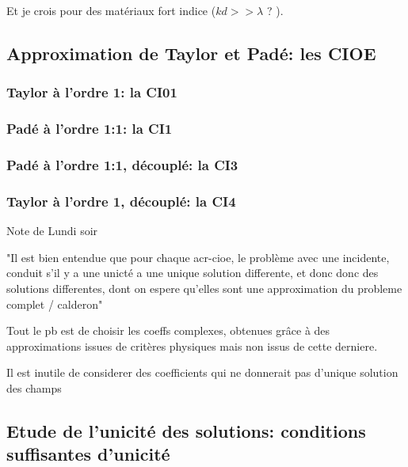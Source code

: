         \begin{REM}
            Et je crois pour des matériaux fort indice (\(kd>>\lambda\) ? ).
        \end{REM}

    \subsection{Approximation de Taylor et Padé: les CIOE}

        \subsubsection{Taylor à l'ordre 1: la CI01}

        \subsubsection{Padé à l'ordre 1:1: la CI1}

        \subsubsection{Padé à l'ordre 1:1, découplé: la CI3}

        \subsubsection{Taylor à l'ordre 1, découplé: la CI4}

        \begin{REM}
            Note de Lundi soir

            "Il est bien entendue que pour chaque \gls{acr-cioe}, le problème avec une incidente, conduit s'il y a une unicté a une unique solution differente, et donc donc des solutions differentes, dont on espere qu'elles sont une approximation du probleme complet / calderon"

            Tout le pb est de choisir les coeffs complexes, obtenues grâce à des approximations issues de critères physiques mais non issus de cette derniere. 

            Il est inutile de considerer des coefficients qui ne donnerait pas d'unique solution des champs
        \end{REM}

    \subsection{Etude de l'unicité des solutions: conditions suffisantes d'unicité}

